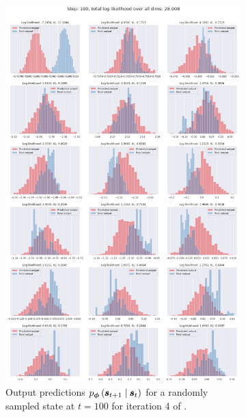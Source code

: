 \begin{figure}
\begin{subfigure}{\textwidth}
    \includegraphics[trim=0 1370 0 50,clip,width=1.0\textwidth]
    {img/windyslope/output/windyslope_output_det2stoc2_dist_10_step100_iter4.png}
    \caption{Output predictions $p_{\vph}\protect\given*{\vns}{\vs}$ for a randomly sampled state at $t=100$ for iteration 4 of \dettostoc{}.}
    \label{fig:output_distribution_step100_posvel_dettostoc}
\end{subfigure}
\begin{subfigure}{\textwidth}

\end{subfigure}
\end{figure}

